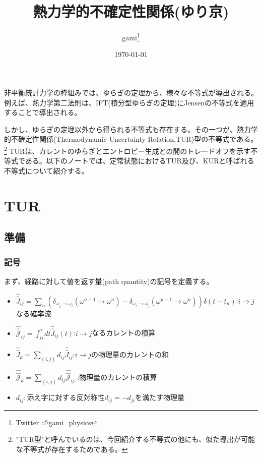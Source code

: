 \documentclass[a4paper,11pt]{jsarticle}
\numberwithin{equation}{section}
\begin{document}
\title{熱力学的不確定性関係(ゆり京)}
\author{gami\footnote{Twitter :@gami\_physics}}
\date{\today}
\maketitle

非平衡統計力学の枠組みでは、ゆらぎの定理から、様々な不等式が導出される。例えば、熱力学第二法則は、IFT(積分型ゆらぎの定理)にJensenの不等式を適用することで導出される。

しかし、ゆらぎの定理以外から得られる不等式も存在する。その一つが、熱力学的不確定性関係(Thermodynamic Uncertainty Relation,TUR)型の不等式である。
\footnote{"TUR型"と呼んでいるのは、今回紹介する不等式の他にも、似た導出が可能な不等式が存在するためである。}
TURは、カレントのゆらぎとエントロピー生成との間のトレードオフを示す不等式である。以下のノートでは、定常状態におけるTUR及び、KURと呼ばれる不等式について紹介する。



\section{TUR}
\subsection{準備}
\subsubsection{記号}
まず、経路に対して値を返す量(path quantity)の記号を定義する。
\begin{itemize}
    \item  $ \hat{\hat{J}}_{ij} =\sum_{n} (\delta_{\omega_j \to \omega_i}(\omega^{n-1}\to \omega^n) - \delta_{\omega_i \to \omega_j}(\omega^{n-1}\to \omega^n)) \delta(t-t_n)$:$i \to j$なる確率流
    \item $\hat{\hat{\mathcal{J}}}_{ij} = 
    \int_{0}^{\tau} dt \hat{\hat{J}}_{ij}(t)$:$i \to j$なるカレントの積算
    \item $\hat{\hat{J}}_{d} = \sum_{(i,j)} d_{ij} \hat{\hat{J}}_{ij}$:$i \to j$の物理量のカレントの和
    \item $\hat{\hat{\mathcal{J}}}_{d} = \sum_{(i,j)} d_{ij} \hat{\hat{\mathcal{J}}}_{ij}$
:物理量のカレントの積算
    \item $d_{ij}:$添え字に対する反対称性$d_{ij} = -d_{ji}$を満たす物理量
\end{itemize}
\end{document}
